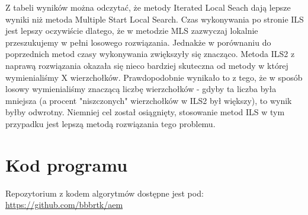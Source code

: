 \documentclass{article}
\begin{document}
Z tabeli wyników można odczytać, że metody Iterated Local Seach dają lepsze wyniki niż metoda Multiple Start Local Search. Czas wykonywania po stronie ILS jest lepszy oczywiście dlatego, że w metodzie MLS zazwyczaj lokalnie przeszukujemy w pełni losowego rozwiązania. Jednakże w porównaniu do poprzednich metod czasy wykonywania zwiększyły się znacząco. Metoda ILS2 z naprawą rozwiązania okazała się nieco bardziej skuteczna od metody w której wymienialiśmy X wierzchołków. Prawdopodobnie wynikało to z tego, że w sposób losowy wymienialiśmy znaczącą liczbę wierzchołków - gdyby ta liczba była mniejsza (a procent "niszczonych" wierzchołków w ILS2 był większy), to wynik byłby odwrotny. Niemniej cel został osiągnięty, stosowanie metod ILS w tym przypadku jest lepszą metodą rozwiązania tego problemu.

\section{Kod programu}

    Repozytorium z kodem algorytmów dostępne jest pod: \url{https://github.com/bbbrtk/aem}
\end{document}
